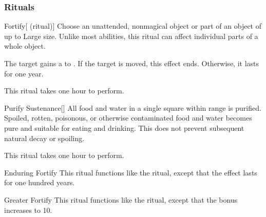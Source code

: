 \subsubsection{Rituals}


\lowercase{\hypertarget{spell:Fortify}{}}\label{spell:Fortify}
\begin{ability}[\nth{1}]{\hypertarget{spell:Fortify}{Fortify}}[ (ritual)]
Choose an unattended, nonmagical object or part of an object of up to Large size.
Unlike most abilities, this ritual can affect individual parts of a whole object.

The target gains a   to .
If the target is moved, this effect ends.
Otherwise, it lasts for one year.

This ritual takes one hour to perform.
\end{ability}
\vspace{0.25em}



\lowercase{\hypertarget{spell:Purify Sustenance}{}}\label{spell:Purify Sustenance}
\begin{ability}[\nth{1}]{\hypertarget{spell:Purify Sustenance}{Purify Sustenance}}[]
All food and water in a single square within \rngclose range is purified.
Spoiled, rotten, poisonous, or otherwise contaminated food and water becomes pure and suitable for eating and drinking.
This does not prevent subsequent natural decay or spoiling.

This ritual takes one hour to perform.
\end{ability}
\vspace{0.25em}



\lowercase{\hypertarget{spell:Enduring Fortify}{}}\label{spell:Enduring Fortify}
\begin{ability}[\nth{3}]{\hypertarget{spell:Enduring Fortify}{Enduring Fortify}}
This ritual functions like the  ritual, except that the effect lasts for one hundred years.
\end{ability}
\vspace{0.25em}



\lowercase{\hypertarget{spell:Greater Fortify}{}}\label{spell:Greater Fortify}
\begin{ability}[\nth{3}]{\hypertarget{spell:Greater Fortify}{Greater Fortify}}
This ritual functions like the  ritual, except that the  bonus increases to 10.
\end{ability}
\vspace{0.25em}



